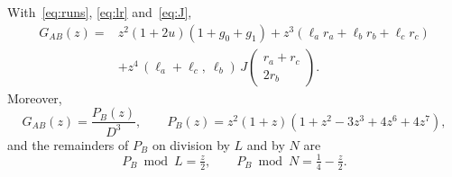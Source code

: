 \begin{proposition}\label{prop:GAB}
With~\eqref{eq:runs}, \eqref{eq:lr} and~\eqref{eq:J},
\begin{equation}\label{eq:GAB}
\begin{aligned}
G_{AB}(z)={}&z^2(1+2u)(1+g_0+g_1)+z^3(\ell_ar_a+\ell_br_b+\ell_cr_c)\\
&+z^4\,(\ell_a+\ell_c,\ \ell_b)\,J\begin{pmatrix}r_a+r_c\\2r_b\end{pmatrix}.
\end{aligned}
\end{equation}
Moreover,
\begin{equation}\label{eq:PB}
G_{AB}(z)=\frac{P_B(z)}{D^3},\qquad P_B(z)=z^2(1+z)(1+z^2-3z^3+4z^6+4z^7),
\end{equation}
and the remainders of $P_B$ on division by $L$ and by $N$ are
\begin{equation}\label{eq:rem}
P_B\bmod L=\tfrac z2,\qquad P_B\bmod N=\tfrac14-\tfrac z2.
\end{equation}
\end{proposition}

